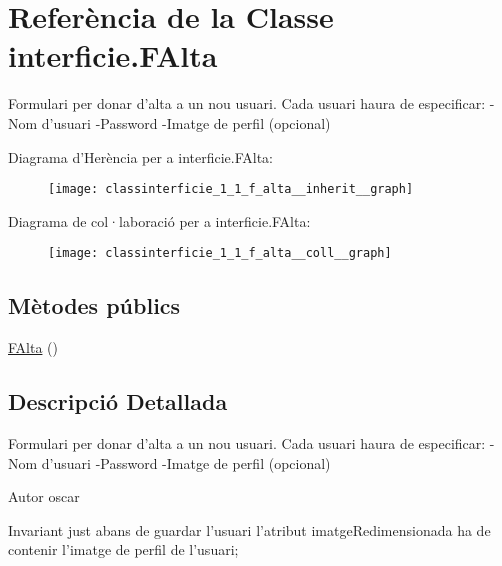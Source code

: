 \hypertarget{classinterficie_1_1_f_alta}{\section{Referència de la Classe interficie.\+F\+Alta}
\label{classinterficie_1_1_f_alta}
}


Formulari per donar d'alta a un nou usuari. Cada usuari haura de especificar\+: -\/\+Nom d'usuari -\/\+Password -\/\+Imatge de perfil (opcional)  




Diagrama d'Herència per a interficie.\+F\+Alta\+:\nopagebreak
\begin{figure}[H]
\begin{center}
\leavevmode
\texttt{[image: classinterficie\_1\_1\_f\_alta\_\_inherit\_\_graph]}
\end{center}
\end{figure}


Diagrama de col·laboració per a interficie.\+F\+Alta\+:\nopagebreak
\begin{figure}[H]
\begin{center}
\leavevmode
\texttt{[image: classinterficie\_1\_1\_f\_alta\_\_coll\_\_graph]}
\end{center}
\end{figure}
\subsection*{Mètodes públics}
\begin{DoxyCompactItemize}
\item 
\hyperlink{classinterficie_1_1_f_alta_ad9049ce9f00f165a714f7d343227cb97}{F\+Alta} ()
\end{DoxyCompactItemize}


\subsection{Descripció Detallada}
Formulari per donar d'alta a un nou usuari. Cada usuari haura de especificar\+: -\/\+Nom d'usuari -\/\+Password -\/\+Imatge de perfil (opcional) 

\begin{DoxyAuthor}{Autor}
oscar 
\end{DoxyAuthor}
\begin{DoxyInvariant}{Invariant}
just abans de guardar l'usuari l'atribut imatge\+Redimensionada ha de contenir l'imatge de perfil de l'usuari; 
\end{DoxyInvariant}


